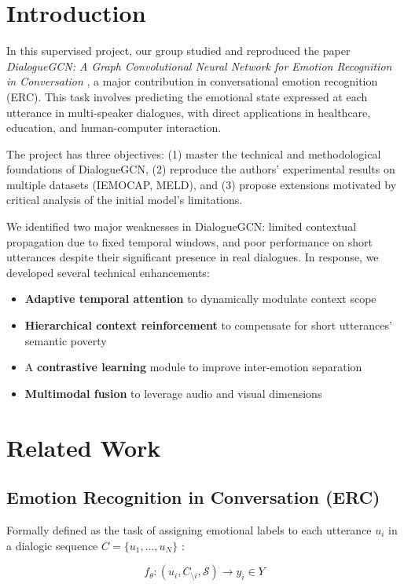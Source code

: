 \documentclass[a4paper,11pt]{article}
\begin{document}
\section{Introduction}
In this supervised project, our group studied and reproduced the paper \textit{DialogueGCN: A Graph Convolutional Neural Network for Emotion Recognition in Conversation} \cite{ghosal2019dialoguegcn}, a major contribution in conversational emotion recognition (ERC). This task involves predicting the emotional state expressed at each utterance in multi-speaker dialogues, with direct applications in healthcare, education, and human-computer interaction.

The project has three objectives: (1) master the technical and methodological foundations of DialogueGCN, (2) reproduce the authors' experimental results on multiple datasets (IEMOCAP, MELD), and (3) propose extensions motivated by critical analysis of the initial model's limitations.

We identified two major weaknesses in DialogueGCN: limited contextual propagation due to fixed temporal windows, and poor performance on short utterances despite their significant presence in real dialogues. In response, we developed several technical enhancements:
\begin{itemize}
    \item \textbf{Adaptive temporal attention} to dynamically modulate context scope
    \item \textbf{Hierarchical context reinforcement} to compensate for short utterances' semantic poverty
    \item A \textbf{contrastive learning} module to improve inter-emotion separation
    \item \textbf{Multimodal fusion} to leverage audio and visual dimensions
\end{itemize}

\section{Related Work}
\subsection{Emotion Recognition in Conversation (ERC)}
Formally defined as the task of assigning emotional labels to each utterance $u_i$ in a dialogic sequence $C = \{u_1,...,u_N\}$ \cite{poria2019meld}:

\[
f_\theta: (u_i, C_{\setminus i}, \mathcal{S}) \rightarrow y_i \in Y
\]
\end{document}
